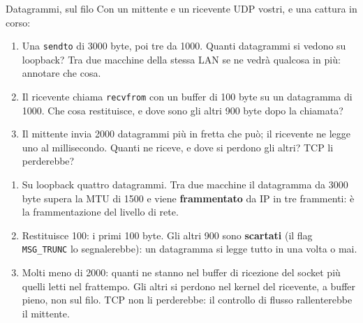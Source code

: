 \begin{esercizio}{Datagrammi, sul filo}
Con un mittente e un ricevente UDP vostri, e una cattura in corso:
\begin{enumerate}[label=(\alph*)]
    \item Una \texttt{sendto} di 3000 byte, poi tre da 1000. Quanti datagrammi si vedono su loopback? Tra due macchine della stessa LAN se
          ne vedrà qualcosa in più: annotare che cosa.
    \item Il ricevente chiama \texttt{recvfrom} con un buffer di 100 byte su un datagramma di 1000. Che cosa restituisce, e dove sono gli
          altri 900 byte dopo la chiamata?
    \item Il mittente invia 2000 datagrammi più in fretta che può; il ricevente ne legge uno al millisecondo. Quanti ne riceve, e dove si
          perdono gli altri? TCP li perderebbe?
\end{enumerate}

\svolgimento
\begin{enumerate}[label=(\alph*)]
    \item Su loopback quattro datagrammi. Tra due macchine il datagramma da 3000 byte supera la MTU di 1500 e viene \textbf{frammentato} da
          IP in tre frammenti: è la frammentazione del livello di rete.
    \item Restituisce 100: i primi 100 byte. Gli altri 900 sono \textbf{scartati} (il flag \texttt{MSG\_TRUNC} lo segnalerebbe): un
          datagramma si legge tutto in una volta o mai.
    \item Molti meno di 2000: quanti ne stanno nel buffer di ricezione del socket più quelli letti nel frattempo. Gli altri si perdono nel
          kernel del ricevente, a buffer pieno, non sul filo. TCP non li perderebbe: il controllo di flusso rallenterebbe il mittente.
\end{enumerate}
\end{esercizio}
